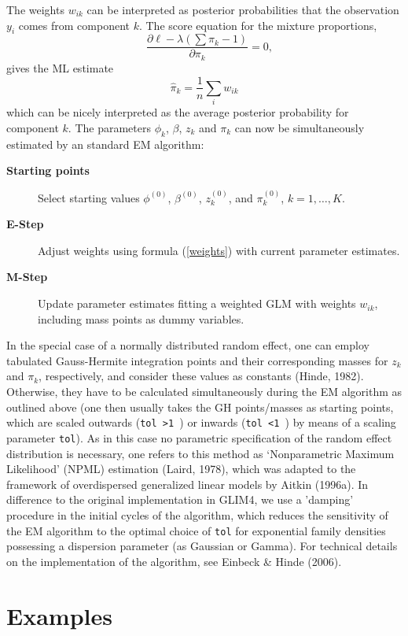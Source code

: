 \documentclass[a4paper]{article}
\begin{document}
\begin{landscape}
The weights $w_{ik}$ can be interpreted as posterior probabilities
that the observation $y_i$ comes from component $k$. The score
equation for the mixture proportions,
\[
\quad \frac{\partial \ell-\lambda(\sum\pi_k-1)}{\partial \pi_k}=0,
\]
gives the ML estimate
\begin{equation}
\label{pik} \hat{\pi}_k=\frac{1}{n}\sum_iw_{ik}
\end{equation}
which can be nicely interpreted as the average posterior
probability for component $k$. The parameters $\phi_k$, $\beta$,
$z_k$ and $\pi_k$ can now be simultaneously estimated by an
standard EM algorithm:
\begin{description}
\item[{\bf Starting points}] Select starting values $\phi^{(0)}$, $\beta^{(0)}$, $z^{(0)}_k$, and $\pi^{(0)}_k$, $k=1, \ldots, K$.
\item[{\bf E-Step}] Adjust weights using formula (\ref{weights}) with current parameter estimates.
\item[{\bf M-Step}] Update parameter estimates fitting a weighted GLM with weights $w_{ik}$, including mass points as dummy variables.
\end{description}

In the special case of a normally distributed random effect, one can employ
tabulated Gauss-Hermite integration points  and their corresponding masses for $z_k$ and $\pi_k$, respectively, and consider these
values as constants (Hinde, 1982).
Otherwise, they have to be calculated simultaneously during the EM algorithm as outlined above (one then usually takes the
GH points/masses as starting points, which are scaled outwards ({\tt tol >1 }) or inwards ({\tt tol <1 }) by means of a scaling parameter {\tt tol}). 
As in this case no parametric specification of the random effect distribution is necessary,
one refers to this method as `Nonparametric Maximum Likelihood' (NPML) estimation (Laird, 1978), which was adapted to the framework
of overdispersed generalized linear models by Aitkin (1996a).  In difference to the original implementation in GLIM4, we use a 'damping' procedure in the initial cycles of the algorithm, which
reduces the sensitivity of the EM algorithm to the optimal choice of {\tt tol} for exponential
family densities possessing a dispersion parameter (as Gaussian or Gamma). For  technical details on the implementation of the algorithm, 
see Einbeck \& Hinde (2006).  


\section{Examples}\label{examples}


\end{landscape}
\end{document}
